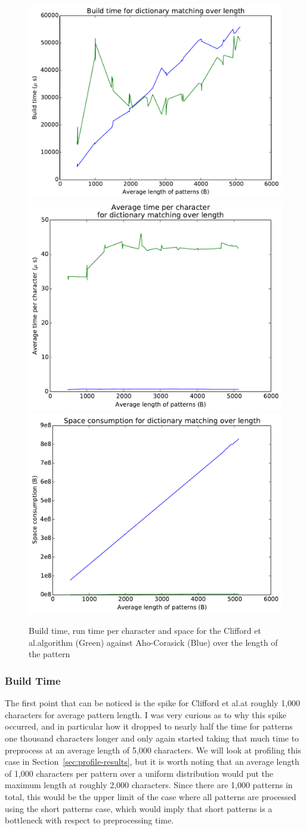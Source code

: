 \documentclass[ %
                    author={Dominic Joseph Moylett},
                    degree={MEng},
                     title={Dictionary Matching with Fingerprints},
                  subtitle={An Empirical Analysis},
                      type={research},
                      year={2015} ]{dissertation}
\begin{document}
\begin{figure}[t]
\begin{center}
  \includegraphics[width=0.5\linewidth]{build_length_1000_10000}\\
  \includegraphics[width=0.5\linewidth]{time_length_1000_10000}\includegraphics[width=0.5\linewidth]{size_length_1000_10000}
\end{center}
\caption{Build time, run time per character and space for the Clifford et al.\@ algorithm (Green) against Aho-Corasick (Blue) over the length of the pattern}
\label{fig:long-pattern-results}
\end{figure}

\subsubsection{Build Time}

The first point that can be noticed is the spike for Clifford et al.\@ at roughly 1,000 characters for average pattern length. I was very curious as to why this spike occurred, and in particular how it dropped to nearly half the time for patterns one thousand characters longer and only again started taking that much time to preprocess at an average length of 5,000 characters. We will look at profiling this case in Section~\ref{sec:profile-results}, but it is worth noting that an average length of 1,000 characters per pattern over a uniform distribution would put the maximum length at roughly 2,000 characters. Since there are 1,000 patterns in total, this would be the upper limit of the case where all patterns are processed using the short patterns case, which would imply that short patterns is a bottleneck with respect to preprocessing time.
\end{document}

